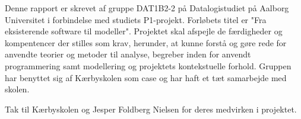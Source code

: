 Denne rapport er skrevet af gruppe DAT1B2-2 på Datalogistudiet på Aalborg Universitet i forbindelse med studiets P1-projekt. Forløbets titel er "Fra eksisterende software til modeller". Projektet skal afspejle de færdigheder og kompentencer der stilles som krav, herunder, at kunne forstå og gøre rede for anvendte teorier og metoder til analyse, begreber inden for anvendt programmering samt modellering og projektets kontekstuelle forhold. Gruppen har benyttet sig af Kærbyskolen som case og har haft et tæt samarbejde med skolen.

Tak til Kærbyskolen og Jesper Foldberg Nielsen for deres medvirken i projektet.